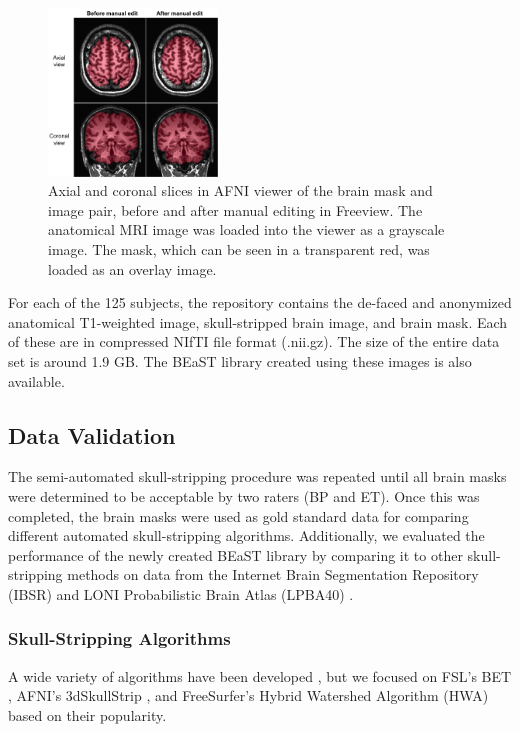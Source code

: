 \begin{figure}[h!]
    \includegraphics[width=0.4\textwidth]{edit.png}
    \caption{
Axial and coronal slices in AFNI viewer of the brain mask and image pair, before and after manual editing in Freeview. The anatomical MRI image was loaded into the viewer as a grayscale image. The mask, which can be seen in a transparent red, was loaded as an overlay image.}
\label{fig:edit}
\end{figure}

For each of the 125 subjects, the repository contains the de-faced and anonymized anatomical T1-weighted image, skull-stripped brain image, and brain mask. Each of these are in compressed NIfTI file format (.nii.gz). The size of the entire data set is around 1.9 GB. The BEaST library created using these images is also available.


\subsection*{Data Validation}

The semi-automated skull-stripping procedure was repeated until all brain masks were determined to be acceptable by two raters (BP and ET). Once this was completed, the brain masks were used as gold standard data for comparing different automated skull-stripping algorithms.  Additionally, we evaluated the performance of the newly created BEaST library by comparing it to other skull-stripping methods on data from the Internet Brain Segmentation Repository (IBSR) \cite{IBSR} and LONI Probabilistic Brain Atlas (LPBA40) \cite{lpba40}.

\subsubsection*{Skull-Stripping Algorithms}
A wide variety of algorithms have been developed \cite{Iglesias2011, MASS, Brainwash, Sadananthan2010, Lutkenhoff2014, Wang2014, pmid21195780, bse}, but we focused on FSL's BET \cite{Smith2002}, AFNI's 3dSkullStrip \cite{afni}, and FreeSurfer's Hybrid Watershed Algorithm (HWA) \cite{Segonne2004} based on their popularity.

